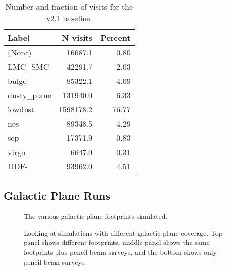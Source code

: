 \begin{table}
\caption{Number and fraction of visits for the v2.1 baseline. \label{table:regions}}
\begin{tabular}{lrr}
      Label &  N visits &  Percent \\
      \hline
   (None)    &   16687.1 &     0.80 \\
    LMC\_SMC &   42291.7 &     2.03 \\
      bulge &   85322.1 &     4.09 \\
dusty\_plane &  131940.0 &     6.33 \\
    lowdust & 1598178.2 &    76.77 \\
        nes &   89348.5 &     4.29 \\
        scp &   17371.9 &     0.83 \\
      virgo &    6647.0 &     0.31 \\
       DDFs &   93962.0 &     4.51 \\
\end{tabular}
\end{table}


\subsection{Galactic Plane Runs}

\begin{figure}
\caption{The various galactic plane footprints simulated.}
\end{figure}


\begin{figure}
\caption{Looking at simulations with different galactic plane coverage. Top panel shows different footprints, middle panel shows the same footprints plus pencil beam surveys, and the bottom shows only pencil beam surveys. \label{fig:gal_plane_radar}}
\end{figure}


